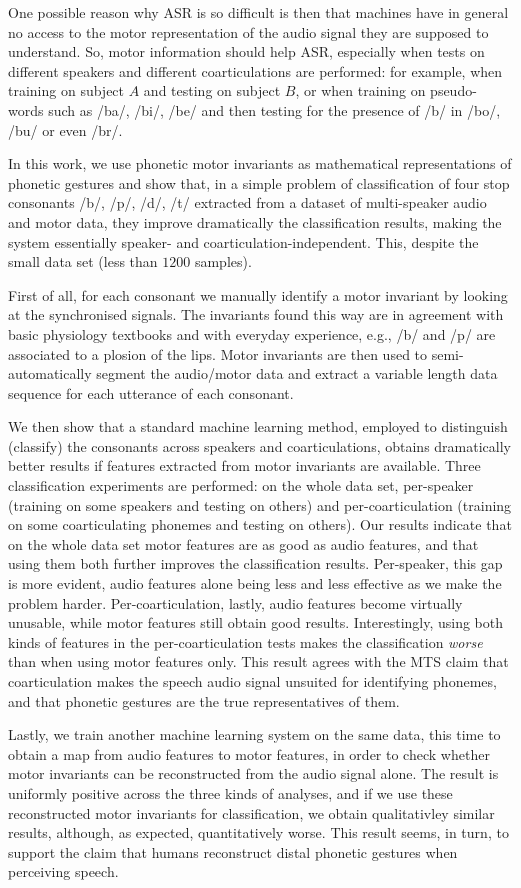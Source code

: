 One possible reason why ASR is so difficult is then that
machines have in general no access to the motor representation of the
audio signal they are supposed to understand. So, motor information should
help ASR, especially when tests on different speakers and different
coarticulations are performed: for example, when training on subject $A$ and
testing on subject $B$, or when training on pseudo-words such as /ba/, /bi/,
/be/ and then testing for the presence of /b/ in /bo/, /bu/ or even /br/.

In this work, we use phonetic motor invariants as mathematical representations
of phonetic gestures and show that, in a simple problem of classification of
four stop consonants /b/, /p/, /d/, /t/ extracted from a dataset of
multi-speaker audio and motor data, they improve dramatically the classification
results, making the system essentially speaker- and coarticulation-independent.
This, despite the small data set (less than $1200$ samples).

First of all, for each consonant we manually identify a motor invariant by
looking at the synchronised signals. The invariants found this way are in
agreement with basic physiology textbooks and with everyday experience,
e.g., /b/ and /p/ are associated to a plosion of the lips. Motor invariants
are then used to semi-automatically segment the audio/motor data and extract
a variable length data sequence for each utterance of each consonant.

We then show that a standard machine learning method, employed to distinguish
(classify) the consonants across speakers and coarticulations, obtains
dramatically better results if features extracted from motor invariants are
available. Three classification experiments are performed: on the whole data set,
per-speaker (training on some speakers and testing on others) and per-coarticulation
(training on some coarticulating phonemes and testing on others). Our results
indicate that on the whole data set motor features are as good as audio features, and that
using them both further improves the classification results. Per-speaker, this gap
is more evident, audio features alone being less and less effective as we make the
problem harder. Per-coarticulation, lastly, audio features become virtually
unusable, while motor features still obtain good results. Interestingly,
using both kinds of features in the per-coarticulation tests makes the
classification \emph{worse} than when using motor features only.
This result agrees with the MTS claim that coarticulation makes
the speech audio signal unsuited for identifying phonemes, and that phonetic
gestures are the true representatives of them.

Lastly, we train another machine learning system on the same data, this time
to obtain a map from audio features to motor features,
in order to check whether motor invariants can be reconstructed
from the audio signal alone. The result is uniformly positive across the three
kinds of analyses, and if we use these reconstructed motor invariants for
classification, we obtain qualitativley similar results, although, as expected,
quantitatively worse. This result seems, in turn, to support the claim
\cite{...} that humans reconstruct distal phonetic gestures when perceiving
speech.
